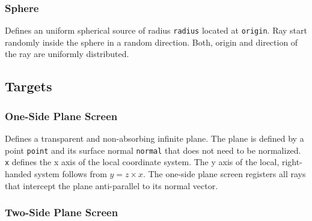 \documentclass[10pt,a4paper,titlepage]{article}
\begin{document}
\subsubsection{Sphere}








Defines an uniform spherical source of radius {\tt radius} located at {\tt origin}. Ray start randomly inside the sphere in a random direction. Both, origin and direction of the ray are uniformly distributed.




\subsection{Targets}

\subsubsection{One-Side Plane Screen}






Defines a transparent and non-absorbing infinite plane. The plane is defined by a point {\tt point} and its surface normal {\tt normal} that does not need to be normalized. {\tt x} defines the x axis of the local coordinate system. The y axis of the local, right-handed system follows from $y=z \times x$. The one-side plane screen registers all rays that intercept the plane anti-parallel to its normal vector.


\subsubsection{Two-Side Plane Screen}

\end{document}
